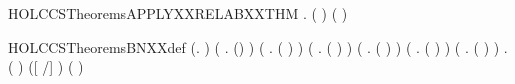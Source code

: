 \newcommand{\HOLCCSTheoremsApplyXXRelabXXCOMPLXXTHM}{\UseVerbatim{HOLCCSTheoremsApplyXXRelabXXCOMPLXXTHM}}
\begin{SaveVerbatim}{HOLCCSTheoremsAPPLYXXRELABXXTHM}
\HOLTokenTurnstile{} \HOLSymConst{\HOLTokenForall{}} .
       (  \HOLSymConst{=}  ) \HOLSymConst{\HOLTokenEquiv{}}
       (  \HOLSymConst{=}  )
\end{SaveVerbatim}
\newcommand{\HOLCCSTheoremsAPPLYXXRELABXXTHM}{\UseVerbatim{HOLCCSTheoremsAPPLYXXRELABXXTHM}}
\begin{SaveVerbatim}{HOLCCSTheoremsBNXXdef}
\HOLTokenTurnstile{} (\HOLSymConst{\HOLTokenForall{}}.    \HOLSymConst{=} \HOLTokenLeftbrace{}\HOLTokenRightbrace{}) \HOLSymConst{\HOLTokenConj{}} (\HOLSymConst{\HOLTokenForall{}}  .  ()  \HOLSymConst{=}   ) \HOLSymConst{\HOLTokenConj{}}
   (\HOLSymConst{\HOLTokenForall{}}  .  ( \HOLSymConst{\ensuremath{+}} )  \HOLSymConst{=}    \HOLConst{\HOLTokenUnion{}}   ) \HOLSymConst{\HOLTokenConj{}}
   (\HOLSymConst{\HOLTokenForall{}}  .  ( \HOLSymConst{\ensuremath{\parallel}} )  \HOLSymConst{=}    \HOLConst{\HOLTokenUnion{}}   ) \HOLSymConst{\HOLTokenConj{}}
   (\HOLSymConst{\HOLTokenForall{}}  .  (\HOLConst{\ensuremath{\nu}}  )  \HOLSymConst{=}    \HOLConst{\HOLTokenUnion{}} ) \HOLSymConst{\HOLTokenConj{}}
   (\HOLSymConst{\HOLTokenForall{}}  .  (  )  \HOLSymConst{=}   ) \HOLSymConst{\HOLTokenConj{}}
   (\HOLSymConst{\HOLTokenForall{}} .  ( )  \HOLSymConst{=} \HOLTokenLeftbrace{}\HOLTokenRightbrace{}) \HOLSymConst{\HOLTokenConj{}}
   \HOLSymConst{\HOLTokenForall{}}  .
        (  )  \HOLSymConst{=}
             ([  /] ) (  )
        \HOLTokenLeftbrace{}\HOLTokenRightbrace{}
\end{SaveVerbatim}
